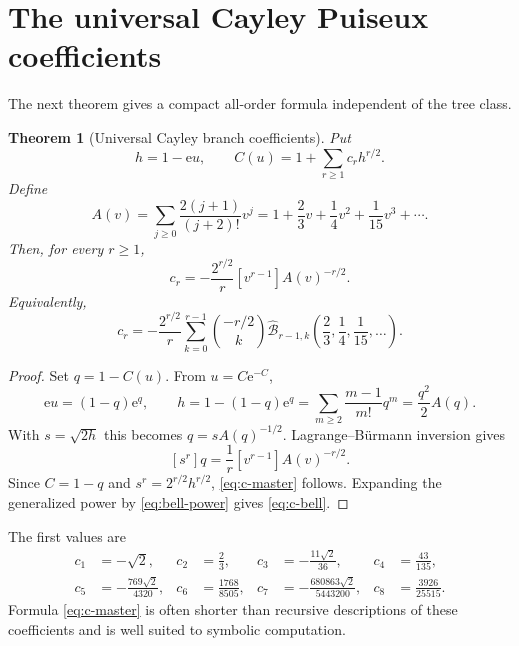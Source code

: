 \documentclass[11pt]{article}
\newtheorem{theorem}{Theorem}[section]
\theoremstyle{definition}
\theoremstyle{remark}
\newcommand{\Bell}{\widehat{\mathcal B}}
\newcommand{\e}{\mathrm e}
\begin{document}
\section{The universal Cayley Puiseux coefficients}
\label{sec:cayley-puiseux}

The next theorem gives a compact all-order formula independent of the tree
class.

\begin{theorem}[Universal Cayley branch coefficients]
\label{thm:cayley-coefficients}
Put
\begin{equation}
 h=1-\e u,
 \qquad
 C(u)=1+\sum_{r\geq1}c_rh^{r/2}.
 \label{eq:cayley-puiseux}
\end{equation}
Define
\begin{equation}
 A(v)=\sum_{j\geq0}\frac{2(j+1)}{(j+2)!}v^j
 =1+\frac23v+\frac14v^2+\frac1{15}v^3+\cdots.
 \label{eq:A-universal}
\end{equation}
Then, for every $r\geq1$,
\begin{equation}
 \boxed{
 c_r=-\frac{2^{r/2}}{r}[v^{r-1}]A(v)^{-r/2}.}
 \label{eq:c-master}
\end{equation}
Equivalently,
\begin{equation}
 c_r=-\frac{2^{r/2}}{r}
 \sum_{k=0}^{r-1}\binom{-r/2}{k}
 \Bell_{r-1,k}\!\left(\frac23,\frac14,\frac1{15},\ldots\right).
 \label{eq:c-bell}
\end{equation}
\end{theorem}

\begin{proof}
Set $q=1-C(u)$.  From $u=C\e^{-C}$,
\[
 \e u=(1-q)\e^q,
 \qquad
 h=1-(1-q)\e^q
   =\sum_{m\geq2}\frac{m-1}{m!}q^m
   =\frac{q^2}{2}A(q).
\]
With $s=\sqrt{2h}$ this becomes
$q=sA(q)^{-1/2}$.  Lagrange--B\"urmann inversion gives
\[
 [s^r]q=\frac1r[v^{r-1}]A(v)^{-r/2}.
\]
Since $C=1-q$ and $s^r=2^{r/2}h^{r/2}$, \cref{eq:c-master} follows.
Expanding the generalized power by \cref{eq:bell-power} gives
\cref{eq:c-bell}.
\end{proof}

The first values are
\begin{align*}
 c_1&=-\sqrt2,&
 c_2&=\frac23,&
 c_3&=-\frac{11\sqrt2}{36},&
 c_4&=\frac{43}{135},\\
 c_5&=-\frac{769\sqrt2}{4320},&
 c_6&=\frac{1768}{8505},&
 c_7&=-\frac{680863\sqrt2}{5443200},&
 c_8&=\frac{3926}{25515}.
\end{align*}
Formula \cref{eq:c-master} is often shorter than recursive descriptions of
these coefficients and is well suited to symbolic computation.
\end{document}
